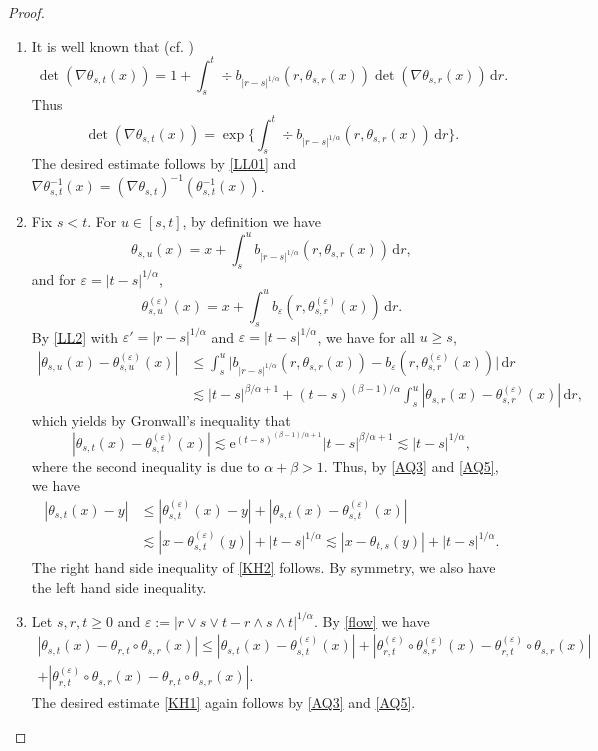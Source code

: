 \documentclass[JEP,XML,SOM,Unicode,published]{cedram}
\theoremstyle{plain}
\theoremstyle{definition}
\newcommand\e{\mathrm{e}}
\let\eps\varepsilon
\newcommand\1{{\mathbf{1}}}
\newcommand{\dif}{\,\mathrm{d}}
\begin{document}
\begin{proof}
\begin{enumerate}
\item
It is well known that (cf. \cite[Prop.\,1.2]{MB02})
\[
\det(\nabla\theta_{s,t}(x))=1+\int^t_s\div b_{|r-s|^{1/\alpha}}(r,\theta_{s,r}(x))\det(\nabla\theta_{s,r}(x))\dif r.
\]
Thus
\[
\det(\nabla\theta_{s,t}(x))=\exp\biggl\{\int^t_s\div b_{|r-s|^{1/\alpha}}(r,\theta_{s,r}(x))\dif r\biggr\}.
\]
The desired estimate follows by \eqref{LL01} and $\nabla\theta^{-1}_{s,t}(x)=(\nabla\theta_{s,t})^{-1}(\theta^{-1}_{s,t}(x))$.

\item
Fix $s<t$. For $u\in[s,t]$, by definition we have
\[
\theta_{s,u}(x)=x+\int^u_sb_{|r-s|^{1/\alpha}}(r,\theta_{s,r}(x))\dif r,
\]
and for $\eps=|t-s|^{1/\alpha}$,
\[
\theta^{(\eps)}_{s,u}(x)=x+\int^u_sb_{\eps}(r,\theta^{(\eps)}_{s,r}(x))\dif r.
\]
By \eqref{LL2} with $\eps'=|r-s|^{1/\alpha}$ and $\eps=|t-s|^{1/\alpha}$, we have for all $u\ge s $,
\begin{align*}
|\theta_{s,u}(x)-\theta^{(\eps)}_{s,u}(x)|
&\le \int^u_s\Big|b_{|r-s|^{1/\alpha}}(r,\theta_{s,r}(x))-b_{\eps}(r,\theta^{(\eps)}_{s,r}(x))\Big|\dif r
\\&\lesssim |t-s|^{\beta/\alpha+1}+(t-s)^{(\beta-1)/\alpha}\int^u_s|\theta_{s,r}(x)-\theta^{(\eps)}_{s,r}(x)|\dif r,
\end{align*}
which yields by Gronwall's inequality that
\begin{equation}\label{AQ5}
|\theta_{s,t}(x)-\theta^{(\eps)}_{s,t}(x)|\lesssim\e^{(t-s)^{(\beta-1)/\alpha+1}} |t-s|^{\beta/\alpha+1}\lesssim |t-s|^{1/\alpha},
\end{equation}
where the second inequality is due to $\alpha+\beta>1$.
Thus, by \eqref{AQ3} and \eqref{AQ5}, we have
\begin{align*}
|\theta_{s,t}(x)-y|&\leq|\theta^{(\eps)}_{s,t}(x)-y|+|\theta_{s,t}(x)-\theta^{(\eps)}_{s,t}(x)|
\\&\lesssim |x-\theta^{(\eps)}_{s,t}(y)|+|t-s|^{1/\alpha}\lesssim |x-\theta_{t,s}(y)|+|t-s|^{1/\alpha}.
\end{align*}
The right hand side inequality of \eqref{KH2} follows. By symmetry, we also have the left hand side inequality.

\item
Let $s,r,t\geq 0$ and $\eps:=|r\vee s\vee t-r\wedge s\wedge t|^{1/\alpha}$. By \eqref{flow} we have
\begin{multline*}
|\theta_{s,t}(x)-\theta_{r,t}\circ\theta_{s,r}(x)|
\leq|\theta_{s,t}(x)-\theta^{(\eps)}_{s,t}(x)|
+|\theta^{(\eps)}_{r,t}\circ\theta^{(\eps)}_{s,r}(x)-\theta^{(\eps)}_{r,t}\circ\theta_{s,r}(x)|
\\+|\theta^{(\eps)}_{r,t}\circ\theta_{s,r}(x)-\theta_{r,t}\circ\theta_{s,r}(x)|.
\end{multline*}
The desired estimate \eqref{KH1} again follows by \eqref{AQ3} and \eqref{AQ5}.\qedhere
\end{enumerate}
\end{proof}
\end{document}

